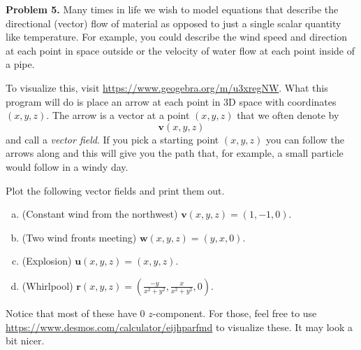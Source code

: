 \documentclass[12pt]{report} %
\theoremstyle{definition}
\begin{document}
\noindent\textbf{Problem 5.} Many times in life we wish to model equations that describe the directional (vector) flow of material as opposed to just a single scalar quantity like temperature.  For example, you could describe the wind speed and direction at each point in space outside or the velocity of water flow at each point inside of a pipe. 

To visualize this, visit \url{https://www.geogebra.org/m/u3xregNW}.  What this program will do is place an arrow at each point in 3D space with coordinates $(x,y,z)$.  The arrow is a vector at a point $(x,y,z)$ that we often denote by
\[
\mathbf{v}(x,y,z)
\]
and call a \emph{vector field}. If you pick a starting point $(x,y,z)$ you can follow the arrows along and this will give you the path that, for example, a small particle would follow in a windy day.

Plot the following vector fields and print them out.
\begin{enumerate}[(a)]
    \item (Constant wind from the northwest) $\mathbf{v}(x,y,z)=(1,-1,0)$.
    \item (Two wind fronts meeting) $\mathbf{w}(x,y,z)=(y,x,0)$.
    \item (Explosion) $\mathbf{u}(x,y,z)=(x,y,z)$.
    \item (Whirlpool) $\mathbf{r}(x,y,z)=\left(\frac{-y}{x^2+y^2},\frac{x}{x^2+y^2},0\right).$
\end{enumerate}
Notice that most of these have 0 $z$-component.  For those, feel free to use \url{https://www.desmos.com/calculator/eijhparfmd} to visualize these.  It may look a bit nicer.
\end{document}
